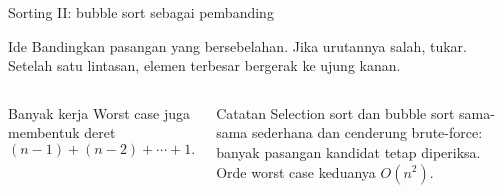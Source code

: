\documentclass[aspectratio=169,11pt]{beamer}
\begin{document}
\begin{frame}{Sorting II: bubble sort sebagai pembanding}
\begin{block}{Ide}
Bandingkan pasangan yang bersebelahan. Jika urutannya salah, tukar. Setelah satu lintasan, elemen terbesar bergerak ke ujung kanan.
\end{block}
\begin{center}
\end{center}
\begin{columns}[T]
\begin{block}{Banyak kerja}
Worst case juga membentuk deret
\[
(n-1)+(n-2)+\cdots+1.
\]
\end{block}
\begin{alertblock}{Catatan}
Selection sort dan bubble sort sama-sama sederhana dan cenderung brute-force: banyak pasangan kandidat tetap diperiksa. Orde worst case keduanya $O(n^2)$.
\end{alertblock}
\end{columns}
\end{frame}
\end{document}
